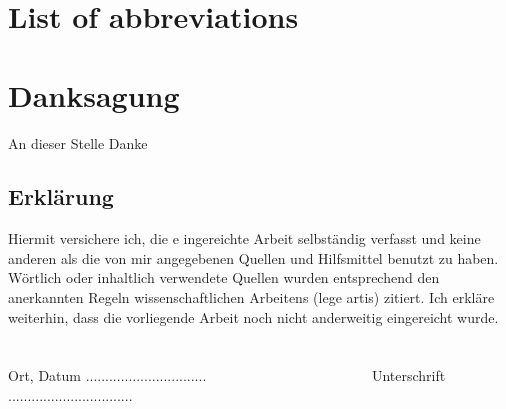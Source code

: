 \documentclass[a4paper,12pt,bibtotocnumbered, twosite]{scrreprt}
\begin{document}
\newpage

\tableofcontents
\chapter*{List of abbreviations}
\begin{acronym}[DARAM]

  
\end{acronym}
\cleardoublepage{}




\newpage  

\newpage

\newpage

\newpage

\listoffigures
\listoftables







\chapter*{Danksagung}

An dieser Stelle Danke 
\newpage
\section*{Erklärung}
Hiermit versichere ich, die e
ingereichte Arbeit selbständig verfasst und
keine anderen als die von mir angegebenen Quellen und Hilfsmittel benutzt zu
haben. Wörtlich oder inhaltlich verwendete Quellen wurden entsprechend den
anerkannten Regeln wissenschaftlichen Arbeitens (lege artis) zitiert. Ich erkläre
weiterhin, dass die vorliegende Arbeit noch nicht anderweitig
eingereicht wurde. 
\\
\\
\\
Ort, Datum ............................... \ \ \ \ \ \ \ \ \ \ \ \ \ \ \ \ \ \ \ \ \ \ \ 
Unterschrift ................................
 
\end{document}
